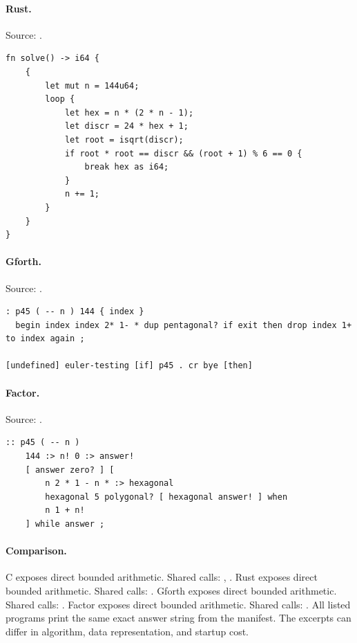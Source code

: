 \paragraph{Rust.} Source: .
\begin{lstlisting}
fn solve() -> i64 {
    {
        let mut n = 144u64;
        loop {
            let hex = n * (2 * n - 1);
            let discr = 24 * hex + 1;
            let root = isqrt(discr);
            if root * root == discr && (root + 1) % 6 == 0 {
                break hex as i64;
            }
            n += 1;
        }
    }
}
\end{lstlisting}

\paragraph{Gforth.} Source: .
\begin{lstlisting}
: p45 ( -- n ) 144 { index }
  begin index index 2* 1- * dup pentagonal? if exit then drop index 1+ to index again ;

[undefined] euler-testing [if] p45 . cr bye [then]
\end{lstlisting}

\paragraph{Factor.} Source: .
\begin{lstlisting}
:: p45 ( -- n )
    144 :> n! 0 :> answer!
    [ answer zero? ] [
        n 2 * 1 - n * :> hexagonal
        hexagonal 5 polygonal? [ hexagonal answer! ] when
        n 1 + n!
    ] while answer ;
\end{lstlisting}

\paragraph{Comparison.}
C exposes direct bounded arithmetic. Shared calls: \texttt{}, \texttt{}. Rust exposes direct bounded arithmetic. Shared calls: \texttt{}. Gforth exposes direct bounded arithmetic. Shared calls: \texttt{}. Factor exposes direct bounded arithmetic. Shared calls: \texttt{}.
All listed programs print the same exact answer string from the manifest. The excerpts can differ in algorithm, data representation, and startup cost.

